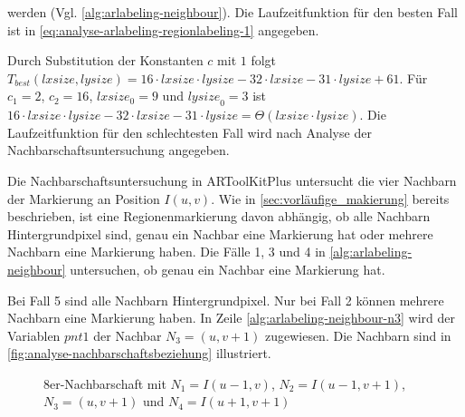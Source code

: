  werden (Vgl. \autoref{alg:arlabeling-neighbour}). Die Laufzeitfunktion für den besten Fall ist in
 \autoref{eq:analyse-arlabeling-regionlabeling-1} angegeben.

Durch Substitution der Konstanten $c$ mit $1$ folgt
 $T_{best}(\mathit{lxsize},\mathit{lysize}) = 16 \cdot \mathit{lxsize} \cdot \mathit{lysize} - 32 \cdot \mathit{lxsize}
 - 31 \cdot \mathit{lysize} + 61$. Für $c_{1} = 2$, $c_{2} = 16$, $\mathit{lxsize}_{0} = 9$ und
 $\mathit{lysize}_{0} = 3$ ist $16 \cdot \mathit{lxsize} \cdot \mathit{lysize} - 32 \cdot \mathit{lxsize}
 - 31 \cdot \mathit{lysize} = \Theta(\mathit{lxsize} \cdot \mathit{lysize})$. Die Laufzeitfunktion für den schlechtesten
 Fall wird nach Analyse der Nachbarschaftsuntersuchung angegeben.

Die Nachbarschaftsuntersuchung in ARToolKitPlus untersucht die vier Nachbarn der Markierung an Position $I(u,v)$. Wie
 in \autoref{sec:vorläufige_makierung} bereits beschrieben, ist eine Regionenmarkierung davon abhängig, ob alle
 Nachbarn Hintergrundpixel sind, genau ein Nachbar eine Markierung hat oder mehrere Nachbarn eine Markierung haben. Die
 Fälle 1, 3 und 4 in \autoref{alg:arlabeling-neighbour} untersuchen, ob genau ein Nachbar eine Markierung hat.

Bei Fall 5 sind alle Nachbarn Hintergrundpixel. Nur bei Fall 2 können  mehrere Nachbarn eine Markierung haben. In Zeile
 \ref{alg:arlabeling-neighbour-n3} wird der Variablen $\mathit{pnt1}$ der Nachbar $N_3 = (u,v+1)$ zugewiesen. Die
 Nachbarn sind in \autoref{fig:analyse-nachbarschaftsbeziehung} illustriert.
\begin{figure}[!ht]
	\centering
	
	\caption{8er-Nachbarschaft mit $N_1 = I(u-1,v)$, $N_2 = I(u-1,v+1)$, $N_3 = (u,v+1)$ und $N_4 = I(u+1,v+1)$}
	\label{fig:analyse-nachbarschaftsbeziehung}
\end{figure}
